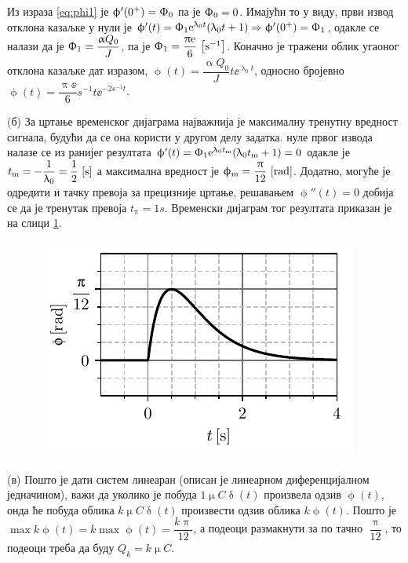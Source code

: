 Из израза \eqref{eq:phi1} је $\upphi'(0^+) = \Upphi_0$ па је 
$\Upphi_0 = 0$. Имајући то у виду, први извод отклона казаљке у нули је 
$\upphi'(t) = \Upphi_1 {\rm e}^{\uplambda_0 t}( \uplambda_0 t + 1 ) \Rightarrow 
\upphi'(0^+) = \Upphi_1
$, одакле се налази да је  
$\Upphi_1 = \dfrac{\upalpha Q_0}{J}$, па је 
$\Upphi_1 =  \dfrac{\uppi {\rm e}}{6} \,\left[\mathrm{s^{-1}}\right]$. Коначно је тражени облик угаоног отклона казаљке 
дат изразом, $\upphi(t) = \dfrac{\upalpha Q_0}{J} t \ee^{\uplambda_0 t}$, односно бројевно 
$\upphi(t) = \dfrac{\uppi\ee}{6}\unit{s^{-1}} t 
\ee^{-2\unit{s^{-1}} t}$.  


(б) За цртање временског дијаграма најважнија је максималну тренутну вредност сигнала, будући
да се она користи у другом делу задатка. 
нуле првог извода налазе се из ранијег резултата 
$\upphi'(t) = \Upphi_1 {\rm e}^{\uplambda_0 t_{\rm m}} (\uplambda_0 t_{\rm m} + 1) = 0$ 
одакле је $t_{\rm m} = -\dfrac{1}{\uplambda_0} = \dfrac{1}{2}\,\left[\mathrm{s}\right]$ а максимална 
вредност је $\upphi_{\rm m} = \dfrac{\uppi}{12}\,\left[\mathrm{rad}\right]$. Додатно, могуће је одредити 
и тачку превоја за прецизније цртање, решавањем $\upphi''(t) = 0$ добија се да је тренутак превоја
$t_{\uppi} = 1\unit{s}$. Временски дијаграм тог резултата приказан је на слици 
\ref{fig:\ID.3}.

\begin{figure}[ht!]
    \centering
    \includegraphics[scale = 1]{fig/BG_plot.pdf}
    \caption{}
    \label{fig:\ID.3}
\end{figure}

(в) Пошто је дати систем линеаран (описан је линеарном диференцијалном једначином), 
важи да уколико је побуда $1\unit{\upmu C} \updelta(t)$ произвела одзив 
$\upphi(t)$, онда ће побуда облика $k \unit{\upmu C} \updelta(t)$ произвести одзив
облика $k \upphi(t)$. Пошто је $\max k\upphi(t) = k \max \upphi(t) = \dfrac{k\uppi}{12}$,
а подеоци размакнути за по тачно $\dfrac{\uppi}{12}$, то подеоци треба да буду 
${Q_k = k\unit{\upmu C}}$.

\vfill

